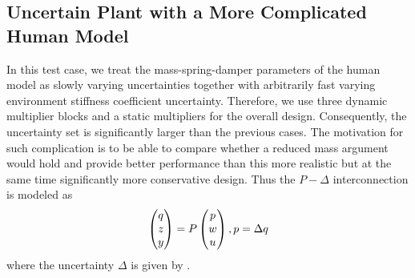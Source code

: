 \let\designtwodataone\empty
\let\designtwodatadtwo\empty


\subsection{Uncertain Plant with a More Complicated Human Model}

In this test case, we treat the mass-spring-damper parameters of the human model as slowly varying uncertainties 
together with arbitrarily fast varying environment stiffness coefficient uncertainty. Therefore, we use three
dynamic multiplier blocks and a static multipliers for the overall design. Consequently, the uncertainty set is 
significantly larger than the previous cases. The motivation for such complication is to be able to compare 
whether a reduced mass argument would hold and provide better performance than this more realistic but at 
the same time significantly more conservative design. Thus the $P-\Delta$ interconnection is modeled as 
\[
\begin{pmatrix}q\\z\\y\end{pmatrix}= P \begin{pmatrix}p\\w\\u\end{pmatrix}, p=\Delta q
\]
where the uncertainty $\Delta$ is given by . 

